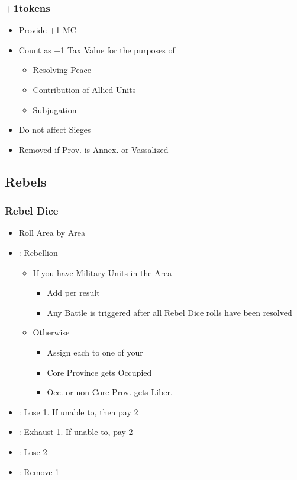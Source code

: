 \documentclass[10pt]{article}
\begin{document}
\subsubsection*{+1\manpower tokens }
\begin{itemize}
	\item Provide +1 MC
	\item Count as +1 Tax Value for the purposes of 
	\begin{itemize}
		\item Resolving Peace
		\item Contribution of Allied Units
		\item Subjugation
	\end{itemize}
	\item Do not affect Sieges
	\item Removed if Prov. is Annex. or Vassalized
\end{itemize}

\subsection*{Rebels }
\subsubsection*{Rebel Dice}
\begin{itemize}
	\item Roll Area by Area
	\item \rebellion: Rebellion
	\begin{itemize}
		\item If you have Military Units in the Area
		\begin{itemize}
			\item Add \rebels per \rebellion result
			\item Any Battle is triggered after all Rebel Dice rolls have been resolved
		\end{itemize}
		\item Otherwise
		\begin{itemize}
			\item Assign each \rebellion to one of your \unrest
			\item Core Province gets Occupied
			\item Occ. or non-Core Prov. gets Liber.
		\end{itemize}
	\end{itemize}
	\item \losemonarchpower: Lose 1\monarchpower. If unable to, then pay 2\ducats
	\item \exhaustunits: Exhaust 1\manpower. If unable to, pay 2\ducats
	\item \loseducats: Lose 2\ducats
	\item \removeunrest: Remove 1 \unrest
\end{itemize}
\end{document}
